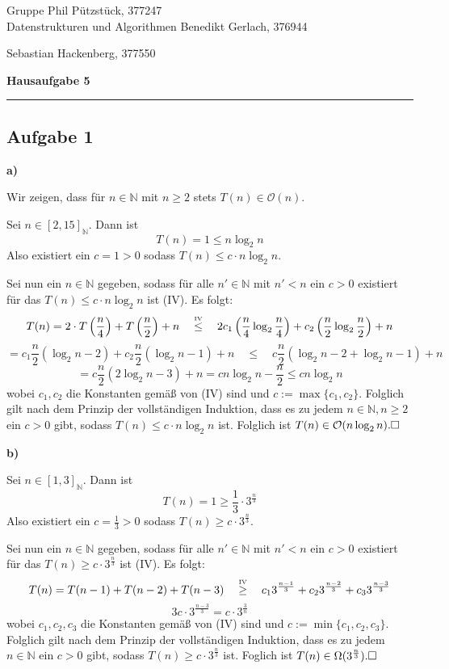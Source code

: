 \documentclass[a4paper,graphics,11pt]{article}
\newcommand{\aufgabe}[1]{\subsection*{Aufgabe #1}}
\newcommand{\up}[2]{\mathrel{\overset{\makebox[0pt]{\mbox{\normalfont\tiny #2}}}{#1}}}
\begin{document}
\noindent Gruppe              \hfill Phil Pützstück, 377247\\
\noindent Datenstrukturen und Algorithmen \hfill Benedikt Gerlach, 376944\\
\strut\hfill Sebastian Hackenberg, 377550\\
\begin{center}
	\LARGE{\textbf{Hausaufgabe 5}}
\end{center}
\begin{center}
\rule[0.1ex]{\textwidth}{1pt}
\end{center}

\aufgabe{1}
\textbf{a)}

Wir zeigen, dass für $n \in \mathbb{N}$ mit $n \geq 2$ stets $T(n) \in \mathcal{O}(n)$.

Sei $n \in [2,15]_\mathbb{N}$. Dann ist
$$
    T(n) = 1 \leq n \log_2 n
$$
Also existiert ein $c = 1 > 0$ sodass $T(n) \leq c\cdot n \log_2 n$.

Sei nun ein $n \in \mathbb{N}$ gegeben, sodass für alle $n' \in \mathbb{N}$ mit $n' < n$ ein $c > 0$ existiert für das
$T(n) \leq c \cdot n\log_2 n$ ist (IV). Es folgt:
$$
    T(n) = 2\cdot T\left(\frac{n}{4}\right) + T\left(\frac{n}{2}\right) + n
    \quad\up{\leq}{IV}\quad 2 c_1\left(\frac{n}{4} \log_2 \frac{n}{4}\right) + c_2 \left(\frac{n}{2} \log_2 \frac{n}{2}\right)
    + n
$$$$
    = c_1\frac{n}{2}(\log_2 n - 2) + c_2\frac{n}{2} (\log_2 n - 1) + n
    \quad\leq\quad c\frac{n}{2} (\log_2 n - 2 + \log_2 n - 1) + n
$$$$
    = c\frac{n}{2} (2\log_2 n - 3) + n
    = cn\log_2 n - \frac{n}{2}
    \leq cn \log_2 n 
$$
wobei $c_1, c_2$ die Konstanten gemäß von (IV) sind und $c := \max \{c_1, c_2\}$.
Folglich gilt nach dem Prinzip der vollständigen Induktion,
dass es zu jedem $n \in \mathbb{N}, n \geq 2$ ein $c > 0$ gibt, sodass $T(n) \leq c\cdot n\log_2 n$ ist.
Folglich ist $T(n) \in \mathcal{O}(n\log_2n).\hfill\square$

\textbf{b)}

Sei $n \in [1,3]_{\mathbb{N}}$. Dann ist
$$
    T(n) = 1 \geq \frac{1}{3} \cdot 3^{\frac{n}{3}}
$$
Also existiert ein $c = \frac{1}{3} > 0$ sodass $T(n) \geq c\cdot 3^{\frac{n}{3}}$.

Sei nun ein $n \in \mathbb{N}$ gegeben, sodass für alle $n' \in \mathbb{N}$ mit $n' < n$ ein
$c > 0$ existiert für das $T(n) \geq c\cdot 3^{\frac{n}{3}}$ ist (IV). Es folgt:
$$
    T(n)
    = T(n-1) + T(n-2) + T(n-3)
    \quad\up{\geq}{IV}\quad c_1 3^{\frac{n-1}{3}} + c_2 3^{\frac{n-2}{3}} + c_3 3^{\frac{n-3}{3}}
$$$$
    3c\cdot 3^{\frac{n-3}{3}} = c\cdot3^\frac{3}{n}
$$
wobei $c_1, c_2, c_3$ die Konstanten gemäß von (IV) sind und $c:= \min \{c_1, c_2, c_3\}$.
Folglich gilt nach dem Prinzip der vollständigen Induktion, dass es zu jedem $n \in \mathbb{N}$ ein
$c > 0$ gibt, sodass $T(n) \geq c\cdot 3^{\frac{n}{3}}$ ist.
Foglich ist $T(n) \in \Omega(3^{\frac{n}{3}}). \hfill\square$
\end{document}
